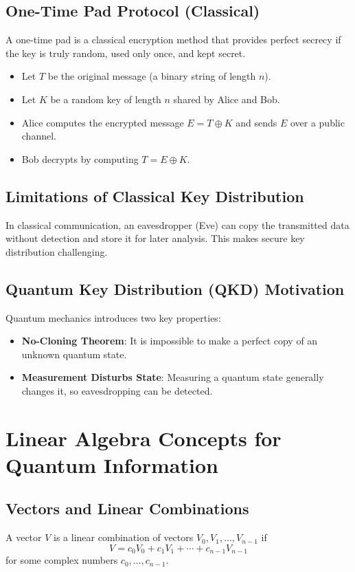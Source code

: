 \documentclass{book}
\begin{document}
\subsection{One-Time Pad Protocol (Classical)}
A one-time pad is a classical encryption method that provides perfect secrecy if the key is truly random, used only once, and kept secret.

\begin{itemize}
    \item Let $T$ be the original message (a binary string of length $n$).
    \item Let $K$ be a random key of length $n$ shared by Alice and Bob.
    \item Alice computes the encrypted message $E = T \oplus K$ and sends $E$ over a public channel.
    \item Bob decrypts by computing $T = E \oplus K$.
\end{itemize}

\subsection{Limitations of Classical Key Distribution}
In classical communication, an eavesdropper (Eve) can copy the transmitted data without detection and store it for later analysis. This makes secure key distribution challenging.

\subsection{Quantum Key Distribution (QKD) Motivation}
Quantum mechanics introduces two key properties:
\begin{itemize}
    \item \textbf{No-Cloning Theorem}: It is impossible to make a perfect copy of an unknown quantum state.
    \item \textbf{Measurement Disturbs State}: Measuring a quantum state generally changes it, so eavesdropping can be detected.
\end{itemize}

\section{Linear Algebra Concepts for Quantum Information}

\subsection{Vectors and Linear Combinations}
A vector $V$ is a linear combination of vectors $V_0, V_1, \ldots, V_{n-1}$ if
\[
V = c_0 V_0 + c_1 V_1 + \cdots + c_{n-1} V_{n-1}
\]
for some complex numbers $c_0, \ldots, c_{n-1}$.
\end{document}
